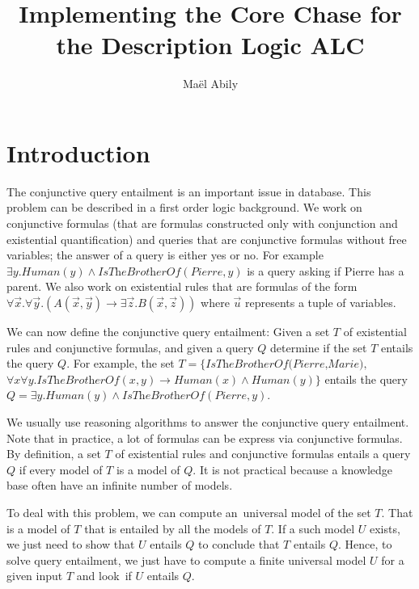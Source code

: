 \documentclass{article}
\title{Implementing the Core Chase for the Description Logic ALC\todo{Horn-ALC}}
\author{Maël Abily}
\theoremstyle{definition}
\theoremstyle{remark}
\begin{document}
\maketitle						%



\section{Introduction}

The conjunctive query entailment is an important issue in database. This problem can be described in a first order logic background. We work on conjunctive formulas (that are formulas constructed only with conjunction and existential quantification) and queries that are conjunctive formulas without free variables; the answer of a query is either yes or no. For example $ \exists y. \textit{Human}(y) \wedge \textit{IsTheBrotherOf}(Pierre,y)$ is a query asking
if Pierre has a parent. We also work on existential rules that are formulas of the form $\forall \vec x.\forall \vec y.( A(\vec x,\vec y) \rightarrow \exists \vec z. B(\vec x,\vec z))$ where $\vec u$ represents a tuple of variables.

We can now define the conjunctive query entailment: Given a set $T$ of existential rules and conjunctive formulas, and given a query $Q$ determine if the set $T$ entails the query $Q$. For example, the set $T= \{\textit{IsTheBrotherOf(Pierre,Marie)},$ $\forall x \forall y. \textit{IsTheBrotherOf}(x,y) \rightarrow \textit{Human}(x) \wedge \textit{Human}(y) \}$ entails the query $Q=\exists y. \textit{Human}(y) \wedge \textit{IsTheBrotherOf}(Pierre,y)$.



We usually use reasoning algorithms to answer the conjunctive query entailment. Note that in practice, a lot of formulas can be express via conjunctive formulas. By definition, a set $T$ of existential rules and conjunctive formulas entails a query $Q$ if every  model of $T$ is a model of $Q$. It is not practical because a knowledge base often have an infinite number of models.

To deal with this problem, we can compute an\ universal model of the set $T$. That is a model of $T$ that is entailed by all the models of $T$. If a such model $U$ exists, we just need to show that $U$ entails $Q$ to conclude that $T$ entails $Q$. Hence, to solve query entailment, we just have to compute a finite universal model $U$ for a given input $T$ and look\ if $U$ entails $Q$.
\end{document}

